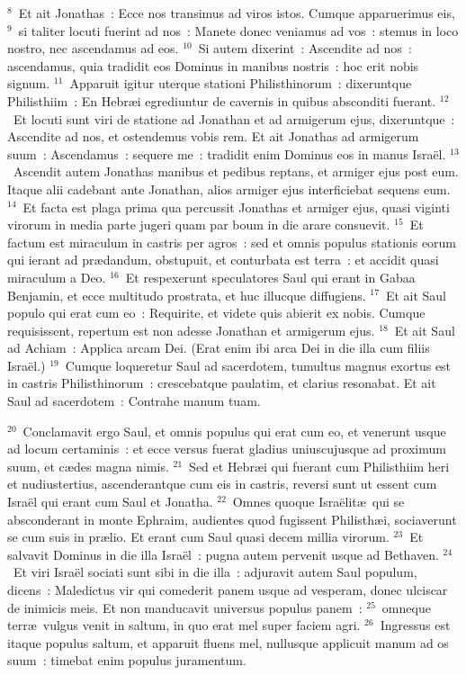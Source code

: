 ${}^{8}$~Et ait Jonathas~: Ecce nos transimus ad viros istos. Cumque apparuerimus eis,
${}^{9}$~si taliter locuti fuerint ad nos~: Manete donec veniamus ad vos~: stemus in loco nostro, nec ascendamus ad eos.
${}^{10}$~Si autem dixerint~: Ascendite ad nos~: ascendamus, quia tradidit eos Dominus in manibus nostris~: hoc erit nobis signum.
${}^{11}$~Apparuit igitur uterque stationi Philisthinorum~: dixeruntque Philisthiim~: En Hebr\ae i egrediuntur de cavernis in quibus absconditi fuerant.
${}^{12}$~Et locuti sunt viri de statione ad Jonathan et ad armigerum ejus, dixeruntque~: Ascendite ad nos, et ostendemus vobis rem. Et ait Jonathas ad armigerum suum~: Ascendamus~: sequere me~: tradidit enim Dominus eos in manus Isra\"el.
${}^{13}$~Ascendit autem Jonathas manibus et pedibus reptans, et armiger ejus post eum. Itaque alii cadebant ante Jonathan, alios armiger ejus interficiebat sequens eum.
${}^{14}$~Et facta est plaga prima qua percussit Jonathas et armiger ejus, quasi viginti virorum in media parte jugeri quam par boum in die arare consuevit.
${}^{15}$~Et factum est miraculum in castris per agros~: sed et omnis populus stationis eorum qui ierant ad pr\ae dandum, obstupuit, et conturbata est terra~: et accidit quasi miraculum a Deo.
${}^{16}$~Et respexerunt speculatores Saul qui erant in Gabaa Benjamin, et ecce multitudo prostrata, et huc illucque diffugiens.
${}^{17}$~Et ait Saul populo qui erat cum eo~: Requirite, et videte quis abierit ex nobis. Cumque requisissent, repertum est non adesse Jonathan et armigerum ejus.
${}^{18}$~Et ait Saul ad Achiam~: Applica arcam Dei. (Erat enim ibi arca Dei in die illa cum filiis Isra\"el.)
${}^{19}$~Cumque loqueretur Saul ad sacerdotem, tumultus magnus exortus est in castris Philisthinorum~: crescebatque paulatim, et clarius resonabat. Et ait Saul ad sacerdotem~: Contrahe manum tuam.


${}^{20}$~Conclamavit ergo Saul, et omnis populus qui erat cum eo, et venerunt usque ad locum certaminis~: et ecce versus fuerat gladius uniuscujusque ad proximum suum, et c\ae des magna nimis.
${}^{21}$~Sed et Hebr\ae i qui fuerant cum Philisthiim heri et nudiustertius, ascenderantque cum eis in castris, reversi sunt ut essent cum Isra\"el qui erant cum Saul et Jonatha.
${}^{22}$~Omnes quoque Isra\"elit\ae\ qui se absconderant in monte Ephraim, audientes quod fugissent Philisth\ae i, sociaverunt se cum suis in pr\ae lio. Et erant cum Saul quasi decem millia virorum.
${}^{23}$~Et salvavit Dominus in die illa Isra\"el~: pugna autem pervenit usque ad Bethaven.
${}^{24}$~Et viri Isra\"el sociati sunt sibi in die illa~: adjuravit autem Saul populum, dicens~: Maledictus vir qui comederit panem usque ad vesperam, donec ulciscar de inimicis meis. Et non manducavit universus populus panem~:
${}^{25}$~omneque terr\ae\ vulgus venit in saltum, in quo erat mel super faciem agri.
${}^{26}$~Ingressus est itaque populus saltum, et apparuit fluens mel, nullusque applicuit manum ad os suum~: timebat enim populus juramentum.


